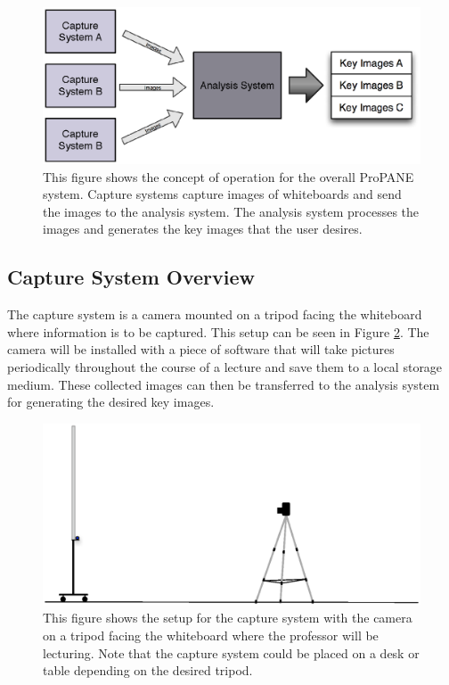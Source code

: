 \documentclass[]{article}
\begin{document}
			\begin{figure}[h]
				\centering
				\includegraphics[scale=0.8]{images/concept-of-operation.eps}
				\caption{This figure shows the concept of operation for the overall ProPANE system. Capture systems capture images of whiteboards and send the images to the analysis system. The analysis system processes the images and generates the key images that the user desires.}		
				\label{img:concept-of-operation}
			\end{figure}
		
		\subsection{Capture System Overview}
			The capture system is a camera mounted on a tripod facing the whiteboard where information is to be captured. This setup can be seen in Figure \ref{img:setup-capture-system}. The camera will be installed with a piece of software that will take pictures periodically throughout the course of a lecture and save them to a local storage medium. These collected images can then be transferred to the analysis system for generating the desired key images. 
			
			\begin{figure}[h]
				\centering
				\includegraphics[scale=0.8]{images/setup-capture-system.eps}
				\caption{This figure shows the setup for the capture system with the camera on a tripod facing the whiteboard where the professor will be lecturing. Note that the capture system could be placed on a desk or table depending on the desired tripod.}		
				\label{img:setup-capture-system}
			\end{figure}
		
\end{document}
